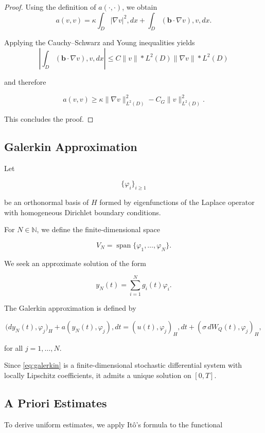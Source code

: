 \begin{proof}
Using the definition of \(a(\cdot,\cdot)\), we obtain
\[
a(v,v)
=
\kappa
\int_D |\nabla v|^2,dx
+
\int_D (\mathbf b\cdot\nabla v),v,dx.
\]

Applying the Cauchy--Schwarz and Young inequalities yields
\[
\left|
\int_D (\mathbf b\cdot\nabla v),v,dx
\right|
\le
C
\|v\|*{L^2(D)}
\|\nabla v\|*{L^2(D)}
\]

and therefore

\[
a(v,v)
\ge
\kappa
\|\nabla v\|_{L^2(D)}^2
-
C_G
\|v\|_{L^2(D)}^2.
\]

This concludes the proof.
\end{proof}

\subsection{Galerkin Approximation}

Let

\[
\{\varphi_i\}_{i\ge 1}
\]

be an orthonormal basis of \(H\) formed by eigenfunctions of the Laplace 
operator with homogeneous Dirichlet boundary conditions.

For \(N\in\mathbb{N}\), we define the finite-dimensional space

\[
V_N
=
\operatorname{span}
\{\varphi_1,\ldots,\varphi_N\}.
\]

We seek an approximate solution of the form

\[
y_N(t)
=
\sum_{i=1}^{N}
g_i(t)\varphi_i.
\]

The Galerkin approximation is defined by

\begin{equation}
\bigl(dy_N(t),\varphi_j\bigr)_H
+
a(y_N(t),\varphi_j),dt
=
(u(t),\varphi_j)_H,dt
+
(\sigma\,dW_Q(t),\varphi_j)_H,
\label{eq:galerkin}
\end{equation}

for all \(j=1,\ldots,N\).

Since \eqref{eq:galerkin} is a finite-dimensional stochastic differential system with 
locally Lipschitz coefficients, it admits a unique solution on \([0,T]\).

\subsection{A Priori Estimates}

To derive uniform estimates, we apply It\^o's formula to the functional

